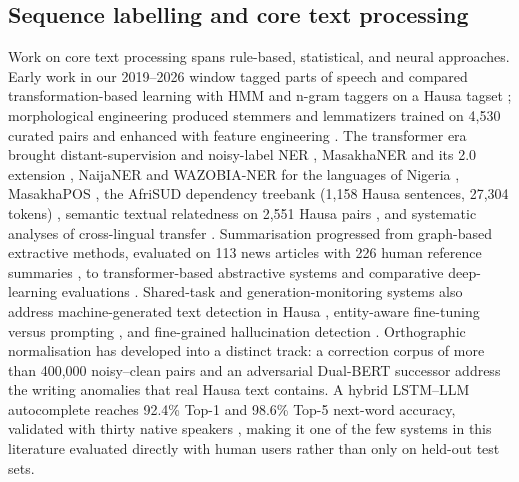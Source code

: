 \documentclass[sn-basic,pdflatex]{sn-jnl}
\begin{document}
\subsection{Sequence labelling and core text processing}
Work on core text processing spans rule-based, statistical, and neural approaches. Early work in our 2019--2026 window tagged parts of speech \citep{p049} and compared transformation-based learning with HMM and n-gram taggers on a Hausa tagset \citep{p052}; morphological engineering produced stemmers \citep{p119,p143} and lemmatizers trained on 4{,}530 curated pairs and enhanced with feature engineering \citep{p066,p120}. The transformer era brought distant-supervision and noisy-label NER \citep{p050,p115}, MasakhaNER and its 2.0 extension \citep{p051,p112}, NaijaNER and WAZOBIA-NER for the languages of Nigeria \citep{p116,p117}, MasakhaPOS \citep{p055}, the AfriSUD dependency treebank (1{,}158 Hausa sentences, 27{,}304 tokens) \citep{p121}, semantic textual relatedness on 2{,}551 Hausa pairs \citep{p061}, and systematic analyses of cross-lingual transfer \citep{p118,p098}. Summarisation progressed from graph-based extractive methods, evaluated on 113 news articles with 226 human reference summaries \citep{p057}, to transformer-based abstractive systems and comparative deep-learning evaluations \citep{p060,p150}. Shared-task and generation-monitoring systems also address machine-generated text detection in Hausa \citep{p068}, entity-aware fine-tuning versus prompting \citep{p069}, and fine-grained hallucination detection \citep{p070}. Orthographic normalisation has developed into a distinct track: a correction corpus of more than 400{,}000 noisy--clean pairs \citep{p067} and an adversarial Dual-BERT successor \citep{p146} address the writing anomalies that real Hausa text contains. A hybrid LSTM--LLM autocomplete reaches 92.4\% Top-1 and 98.6\% Top-5 next-word accuracy, validated with thirty native speakers \citep{p074}, making it one of the few systems in this literature evaluated directly with human users rather than only on held-out test sets.
\end{document}
